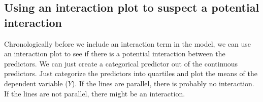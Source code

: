 \documentclass[
]{book}
\newenvironment{Shaded}{\begin{snugshade}}{\end{snugshade}}
\newcommand{\AttributeTok}[1]{\textcolor[rgb]{0.13,0.29,0.53}{#1}}
\newcommand{\CommentTok}[1]{\textcolor[rgb]{0.56,0.35,0.01}{\textit{#1}}}
\newcommand{\ConstantTok}[1]{\textcolor[rgb]{0.56,0.35,0.01}{#1}}
\newcommand{\DecValTok}[1]{\textcolor[rgb]{0.00,0.00,0.81}{#1}}
\newcommand{\FloatTok}[1]{\textcolor[rgb]{0.00,0.00,0.81}{#1}}
\newcommand{\FunctionTok}[1]{\textcolor[rgb]{0.13,0.29,0.53}{\textbf{#1}}}
\newcommand{\NormalTok}[1]{#1}
\newcommand{\OtherTok}[1]{\textcolor[rgb]{0.56,0.35,0.01}{#1}}
\newcommand{\SpecialCharTok}[1]{\textcolor[rgb]{0.81,0.36,0.00}{\textbf{#1}}}
\newcommand{\StringTok}[1]{\textcolor[rgb]{0.31,0.60,0.02}{#1}}
\begin{document}
\subsection{Using an interaction plot to suspect a potential interaction}\label{interaction_plot}

Chronologically before we include an interaction term in the model, we can use an interaction plot
to see if there is a potential interaction between the predictors.
We can just create a categorical predictor out of the continuous predictors.
Just categorize the predictors into quartiles and plot the means of the dependent variable (\(Y\)).
If the lines are parallel, there is probably no interaction. If the lines are not parallel,
there might be an interaction.

\begin{Shaded}
\end{Shaded}
\end{document}
